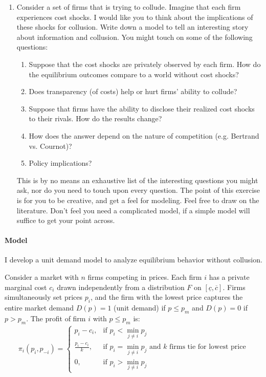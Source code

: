 \documentclass[12pt]{article}
\begin{document}
\begin{enumerate}
\item Consider a set of firms that is trying to collude. Imagine that each firm experiences cost shocks. I would like you to think about the implications of these shocks for collusion. Write down a model to tell an interesting story about information and collusion. You might touch on some of the following questions:
    \begin{enumerate}
        \item Suppose that the cost shocks are privately observed by each firm. How do the equilibrium outcomes compare to a world without cost shocks?
        \item Does transparency (of costs) help or hurt firms' ability to collude?
        \item Suppose that firms have the ability to disclose their realized cost shocks to their rivals. How do the results change?
        \item How does the answer depend on the nature of competition (e.g. Bertrand vs. Cournot)?
        \item Policy implications?
    \end{enumerate}
    This is by no means an exhaustive list of the interesting questions you might ask, nor do you need to touch upon every question. The point of this exercise is for you to be creative, and get a feel for modeling. Feel free to draw on the literature. Don't feel you need a complicated model, if a simple model will suffice to get your point across.
\end{enumerate}


\paragraph{Model}
I develop a unit demand model to analyze equilibrium behavior without collusion.

Consider a market with $n$ firms competing in prices. Each firm $i$ has a private marginal cost $c_i$ drawn independently from a distribution $F$ on $[\underline{c}, \overline{c}]$. Firms simultaneously set prices $p_i$, and the firm with the lowest price captures the entire market demand $D(p) = 1$ (unit demand) if $p\leq p_m$ and $D(p)=0$ if $p>p_m$. The profit of firm $i$ with $p\leq p_m$ is:
\begin{equation}
    \begin{aligned}
        \pi_i(p_i, p_{-i}) =
        \begin{cases}
            p_i - c_i, & \text{if } p_i < \min_{j \neq i} p_j \\
            \frac{p_i - c_i}{k}, & \text{if } p_i = \min_{j \neq i} p_j \text{ and } k \text{ firms tie for lowest price} \\
            0, & \text{if } p_i > \min_{j \neq i} p_j
        \end{cases}
    \end{aligned}
    \nonumber
\end{equation}
\end{document}
